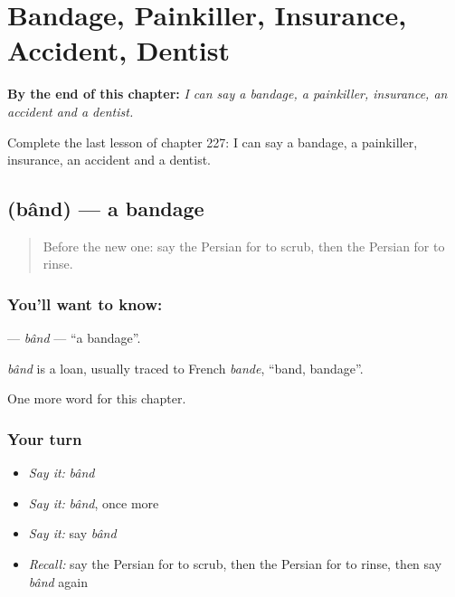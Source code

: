 
\chapter{Bandage, Painkiller, Insurance, Accident, Dentist}
\label{ch:fa-bandage-painkiller-insurance-accident-dentist}

\begin{chapteropening}
\textbf{By the end of this chapter:} \emph{I can say a bandage, a painkiller, insurance, an accident and a dentist.}

Complete the last lesson of chapter 227: I can say a bandage, a painkiller, insurance, an accident and a dentist.
\end{chapteropening}

\section[\texorpdfstring{\fa{باند} (bând)}{باند (bând)}]{ (bând) — a bandage}

\label{lesson:FA-C227-band}



\begin{quote}
Before the new one: say the Persian for to scrub, then the Persian for to rinse.
\end{quote}

\subsection*{You'll want to know: }
\textbf{} — \emph{bând} — \textquotedblleft{}a bandage\textquotedblright{}.

\begin{cousinweb}
\emph{bând} is a loan, usually traced to French \emph{bande}, \textquotedblleft{}band, bandage\textquotedblright{}.
\end{cousinweb}

\begin{grammarlens}[title={What you've built}]
One more word for this chapter.
\end{grammarlens}

\subsection*{Your turn}
\begin{itemize}
\raggedright
  \item \emph{Say it:} \emph{bând}
  \item \emph{Say it:} \emph{bând}, once more
  \item \emph{Say it:} say \emph{bând}
  \item \emph{Recall:} say the Persian for to scrub, then the Persian for to rinse, then say \emph{bând} again
\end{itemize}


